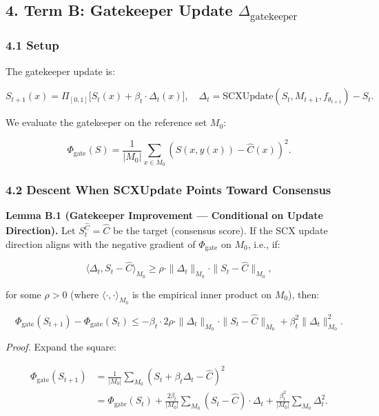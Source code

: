\documentclass[
  12pt,
]{article}
\begin{document}
\subsection{\texorpdfstring{4. Term B: Gatekeeper Update
\(\Delta_{\text{gatekeeper}}\)}{4. Term B: Gatekeeper Update \textbackslash Delta\_\{\textbackslash text\{gatekeeper\}\}}}\label{term-b-gatekeeper-update-delta_textgatekeeper}

\subsubsection{4.1 Setup}\label{setup-1}

The gatekeeper update is:

\[S_{t+1}(x) = \Pi_{[0,1]}\bigl[S_t(x) + \beta_t \cdot \Delta_t(x)\bigr], \quad \Delta_t = \text{SCXUpdate}(S_t, M_{t+1}, f_{\theta_{t+1}}) - S_t.\]

We evaluate the gatekeeper on the reference set \(M_0\):

\[\Phi_{\text{gate}}(S) = \frac{1}{|M_0|} \sum_{x \in M_0} (S(x, y(x)) - \hat{C}(x))^2.\]

\subsubsection{4.2 Descent When SCXUpdate Points Toward
Consensus}\label{descent-when-scxupdate-points-toward-consensus}

\textbf{Lemma B.1 (Gatekeeper Improvement --- Conditional on Update
Direction).} Let \(S_t^{\hat{C}} = \hat{C}\) be the target (consensus
score). If the SCX update direction aligns with the negative gradient of
\(\Phi_{\text{gate}}\) on \(M_0\), i.e., if:

\[\langle \Delta_t, S_t - \hat{C} \rangle_{M_0} \geq \rho \cdot \|\Delta_t\|_{M_0} \cdot \|S_t - \hat{C}\|_{M_0},\]

for some \(\rho > 0\) (where \(\langle \cdot, \cdot \rangle_{M_0}\) is
the empirical inner product on \(M_0\)), then:

\[\Phi_{\text{gate}}(S_{t+1}) - \Phi_{\text{gate}}(S_t) \leq -\beta_t \cdot 2\rho \cdot \|\Delta_t\|_{M_0} \cdot \|S_t - \hat{C}\|_{M_0} + \beta_t^2 \|\Delta_t\|_{M_0}^2.\]

\emph{Proof.} Expand the square:

\[\begin{aligned}
\Phi_{\text{gate}}(S_{t+1}) &= \frac{1}{|M_0|} \sum_{M_0} (S_t + \beta_t \Delta_t - \hat{C})^2 \\
&= \Phi_{\text{gate}}(S_t) + \frac{2\beta_t}{|M_0|} \sum_{M_0} (S_t - \hat{C}) \cdot \Delta_t + \frac{\beta_t^2}{|M_0|} \sum_{M_0} \Delta_t^2.
\end{aligned}\]
\end{document}
